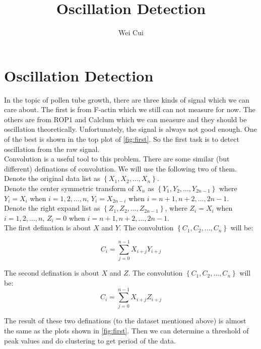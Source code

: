 \documentclass[12pt]{article}
\title{Oscillation Detection}
\author{Wei Cui}
\begin{document}
\maketitle
\section{Oscillation Detection}
In the topic of pollen tube growth, there are three kinds of signal which we can care about. The first is from F-actin which we still can not measure for now. The others are from ROP1 and Calclum which we can measure and they should be oscillation theoretically. Unfortunately, the signal is always not good enough. One of the best is shown in the top plot of \ref{fig:first}. So the first task is to detect oscillation from the raw signal. \\

Convolution is a useful tool to this problem. There are some similar (but different) definations of convolution. We will use the following two of them. \\

Denote the original data list as $\left\{X_{1}, X_{2}, \ldots, X_{n}\right\}$. \\

Denote the center symmetric transform of $X_{n}$ as $\left\{Y_{1}, Y_{2}, \ldots, Y_{2n-1}\right\}$ where $Y_{i} = X_{i}$ when $i = 1, 2, \ldots, n$, $Y_{i} = X_{2n-i}$ when $i = n + 1, n + 2, \ldots, 2n - 1$. \\

Denote the right expand list as $\left\{Z_{1}, Z_{2}, \ldots, Z_{2n-1}\right\}$, where $Z_{i} = X_{i}$ when $i = 1, 2, \ldots, n$, $Z_{i} = 0$ when $i = n + 1, n + 2, \ldots, 2n - 1$. \\

The first defination is about $X$ and $Y$. The convolution $\left\{C_{1}, C_{2}, \ldots, C_{n}\right\}$ will be: 

\begin{equation}
C_{i} = \sum_{j=0}^{n-1}X_{i+j}Y_{i+j}
\end{equation}

The second defination is about $X$ and $Z$. The convolution $\left\{C_{1}, C_{2}, \ldots, C_{n}\right\}$ will be: 
\begin{equation}
C_{i} = \sum_{j=0}^{n-1}X_{i+j}Z_{i+j}
\end{equation}

The result of these two definations (to the dataset mentioned above) is almost the same as the plots shown in \ref{fig:first}. Then we can determine a threshold of peak values and do clustering to get period of the data. \\
\end{document}
